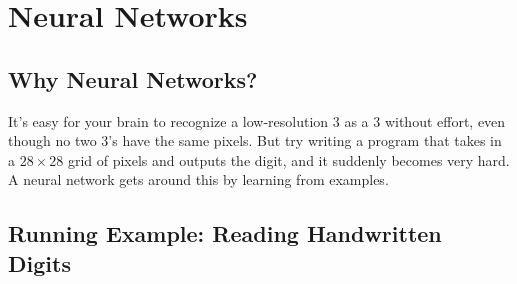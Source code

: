 \section*{Neural Networks}

\subsection*{Why Neural Networks?}
It's easy for your brain to recognize a low-resolution 3 as a 3 without effort, even though no two 3's have the same pixels. But try writing a program that takes in a $28 \times 28$ grid of pixels and outputs the digit, and it suddenly becomes very hard. A neural network gets around this by learning from examples.

\subsection*{Running Example: Reading Handwritten Digits}
